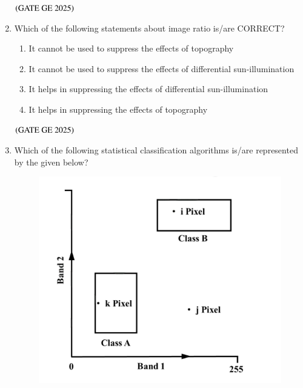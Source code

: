 \documentclass[journal,12pt,onecolumn]{IEEEtran}
\theoremstyle{remark}
\begin{document}
\begin{enumerate}
\begin{center}
\begin{tabular}{cc}
\end{tabular}
\end{center}
\begin{enumerate}
\end{enumerate}
\hfill $\left(\text{GATE GE 2025}\right)$
\bigskip
\item Which of the following statements about image ratio is/are CORRECT?
\begin{enumerate}
\item It cannot be used to suppress the effects of topography
\item It cannot be used to suppress the effects of differential sun-illumination
\item It helps in suppressing the effects of differential sun-illumination
\item It helps in suppressing the effects of topography
\end{enumerate}
\hfill $\left(\text{GATE GE 2025}\right)$
\bigskip
\item Which of the following statistical classification algorithms is/are represented by the  given below?
\\
\begin{figure}[H]
    \centering
    \includegraphics[width=0.3\columnwidth]{figs/fig11.png}
    \caption{}
    \label{figs:fig11}
\end{figure}


\end{enumerate}
\end{document}
